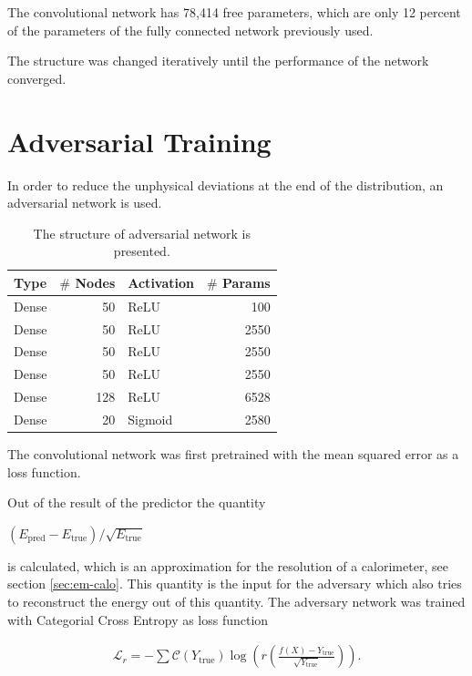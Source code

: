 \documentclass[12pt, a4paper]{thesis}
\begin{document}
The convolutional network has 78,414 free parameters, which are only
12 percent of the parameters of the fully connected network previously
used.

The structure was changed iteratively until the performance of the
network converged.

\section{Adversarial Training}
\label{sec:org30a0273}

In order to reduce the unphysical deviations at the end of the
distribution, an adversarial network is used.


\begin{table}[htbp]
  \centering
  \begin{tabular}{lrlr}
    Type & \(\#\) Nodes & Activation & \(\#\) Params\\
    \hline
    Dense & 50 & ReLU & 100\\
    Dense & 50 & ReLU & 2550\\
    Dense & 50 & ReLU & 2550\\
    Dense & 50 & ReLU & 2550\\
    Dense & 128& ReLU & 6528\\
    Dense & 20 & Sigmoid & 2580\\ 
  \end{tabular}
  \caption{The structure of adversarial network is presented.}
  \label{adv_structure}
\end{table}


The convolutional network was first pretrained with the mean squared
error as a loss function.

Out of the result of the predictor the quantity

\((E_{\text{pred}}-E_{\text{true}})/\sqrt{E_{\text{true}}}\)

is calculated, which is an approximation for the resolution of a
calorimeter, see section \ref{sec:em-calo}. This quantity is the input
for the adversary which also tries to reconstruct the energy out of
this quantity. The adversary network was trained with Categorial Cross
Entropy as loss function

\begin{align}
\mathcal{L}_r = - \sum \mathcal{C}\left(Y_{\text{true}}\right)
\log(r\left(\frac{f(X)-Y_{\text{true}}}{\sqrt{Y_{\text{true}}}}\right)).
\end{align}
\end{document}
